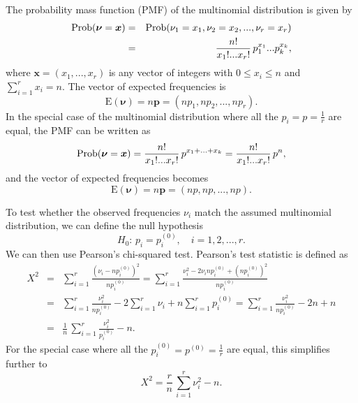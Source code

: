 The probability mass function (PMF) of the multinomial distribution is given by
\begin{eqnarray}
\text{Prob}\!\left(\bm{\nu} = \bm{x}\right) &=& \text{Prob}\!\left(\nu_1 = x_1, \nu_2 = x_2, ..., \nu_r = x_r\right) \\
                     &=& \frac{n!}{x_1!...x_r!} \, p_1^{x_1} ... p_k^{x_k},
\end{eqnarray}
where $\bm{x} = (x_1, ..., x_r)$ is any vector of integers with $0 \le x_i \le n$ and $\sum_{i=1}^r x_i = n$. The vector of expected frequencies is 
\begin{equation} \label{eq:vecexpfreq}
\text{E}(\bm{\nu}) = n\bm{p} = (np_1, np_2, ..., np_r).
\end{equation}
In the special case of the multinomial distribution where all the $p_i = p = \frac{1}{r}$ are equal, the PMF can be written as
\begin{equation}
\text{Prob}\!\left(\bm{\nu} = \bm{x}\right) = \frac{n!}{x_1!...x_r!} \, p^{x_1 + ... + x_k} = \frac{n!}{x_1!...x_r!} \, p^{n},
\end{equation}
and the vector of expected frequencies becomes
\begin{equation}
\text{E}(\bm{\nu}) = n\bm{p} = (np, np, ..., np).
\end{equation}

To test whether the observed frequencies $\nu_i$ match the assumed multinomial distribution, we can define the null hypothesis
\begin{equation}
H_0: \, p_i = p_i^{(0)},     \quad i = 1, 2, ..., r.
\end{equation}
We can then use Pearson's chi-squared test. Pearson's test statistic is defined as 
\begin{eqnarray} \label{eq:pearsons}
X^2 &=& \sum_{i=1}^r{ \frac{\left(\nu_i - np_i^{(0)}\right)^2}{np_i^{(0)}} } = \sum_{i=1}^r{ \frac{\nu_i^2 - 2\nu_i np_i^{(0)} + \left(n p_i^{(0)}\right)^2}{np_i^{(0)}} } \\
    &=& \sum_{i=1}^r{ \frac{\nu_i^2}{np_i^{(0)}} } - 2 \sum_{i=1}^r{\nu_i} + n \sum_{i=1}^r{p_i^{(0)}} = \sum_{i=1}^r{ \frac{\nu_i^2}{np_i^{(0)}} } - 2 n + n \\
    &=& \frac{1}{n} \, \sum_{i=1}^r{ \frac{\nu_i^2}{p_i^{(0)}} } - n.
\end{eqnarray}
For the special case where all the $p_i^{(0)} = p^{(0)} = \frac{1}{r}$ are equal, this simplifies further to 
\begin{equation}
X^2 = \frac{r}{n} \, \sum_{i=1}^r{ \nu_i^2 } - n.
\end{equation}

